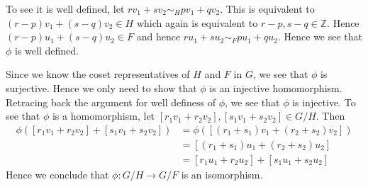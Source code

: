 \documentclass[12pt]{exam}
\theoremstyle{plain} %
\theoremstyle{definition} %
\theoremstyle{remark} %
\begin{document}
\begin{questions}
\begin{solution}
\begin{parts}
      To see it is well defined, let $rv_{1} + sv_{2} \sim_H pv_{1} + qv_{2}$. This is equivalent to $(r-p)v_{1} + (s-q)v_{2} \in H$ which again is equivalent to $r-p, s-q \in \mathbb{Z}$. Hence $(r-p) u_{1} + (s-q) u_{2} \in F$ and hence $ru_{1} + su_{2} \sim_F pu_{1} + qu_{2}$. Hence we see that $\phi$ is well defined.
      
      Since we know the coset representatives of $H$ and $F$ in $G$, we see that $\phi$ is surjective. Hence we only need to show that $\phi$ is an injective homomorphism. Retracing back the argument for well definess of $\phi$, we see that $\phi$ is injective. To see that $\phi$ is a homomorphism, let $[r_{1} v_{1} + r_{2} v_{2}] , [s_{1} v_{1} + s_{2} v_{2} ]\in G/H$. Then 
      \begin{align*}
        \phi([r_{1} v_{1} + r_{2} v_{2}] + [s_{1} v_{1} + s_{2} v_{2} ]) &= \phi([(r_{1}+s_{1})v_{1} + (r_{2}+s_{2})v_{2}]) \\ 
        &= [(r_{1}+s_{1})u_{1} + (r_{2}+s_{2})u_{2}] \\ 
        &= [r_{1} u_{1} + r_{2} u_{2}] + [s_{1} u_{1} + s_{2} u_{2}] 
      \end{align*}
      Hence we conclude that $\phi: G/H \to G/F$ is an isomorphism.
    \end{parts}
  \end{solution}


\end{questions}
\printbibliography[heading=bibintoc]
\end{document}
